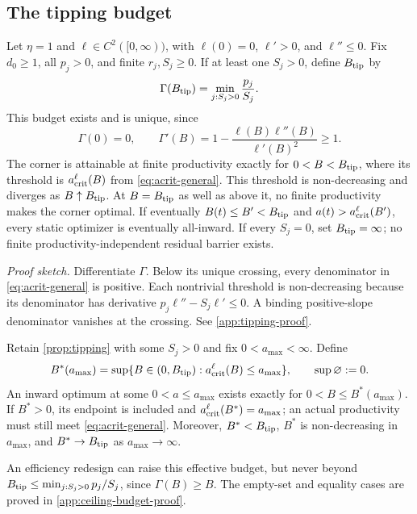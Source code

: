 \subsection{The tipping budget}

\begin{proposition}
\label{prop:tipping}
Let $\eta=1$ and $\ell\in C^2([0,\infty))$, with $\ell(0)=0$,
$\ell'>0$, and $\ell''\leq0$. Fix $d_0\geq1$, all $p_j>0$, and finite
$r_j,S_j\geq0$. If at least one $S_j>0$, define $B_{\rm tip}$ by
\begin{equation}
 \Gamma(B_{\rm tip})=\min_{j:S_j>0}\frac{p_j}{S_j}.
 \label{eq:tipping-budget}
\end{equation}
This budget exists and is unique, since
\begin{equation}
 \Gamma(0)=0,\qquad
 \Gamma'(B)=1-\frac{\ell(B)\ell''(B)}{\ell'(B)^2}\geq1.
 \label{eq:gamma-monotone}
\end{equation}
The corner is attainable at finite productivity exactly for
$0<B<B_{\rm tip}$, where its threshold is
$a_{\rm crit}^{\ell}(B)$ from \cref{eq:acrit-general}.
This threshold is non-decreasing and diverges as
$B\uparrow B_{\rm tip}$. At $B=B_{\rm tip}$ as well as above it,
no finite productivity makes the corner optimal.
If eventually $B(t)\leq B'<B_{\rm tip}$ and
$a(t)>a_{\rm crit}^{\ell}(B')$, every static optimizer is eventually
all-inward. If every $S_j=0$, set
$B_{\rm tip}=\infty$; no finite productivity-independent residual
barrier exists.
\end{proposition}
\noindent\emph{Proof sketch.}
Differentiate $\Gamma$. Below its unique crossing, every denominator
in \cref{eq:acrit-general} is positive. Each nontrivial threshold is
non-decreasing because its denominator has derivative
$p_j\ell''-S_j\ell'\leq0$. A binding positive-slope denominator
vanishes at the crossing. See \cref{app:tipping-proof}.

\begin{corollary}
\label{cor:ceiling-budget}
Retain \cref{prop:tipping} with some $S_j>0$ and fix
$0<a_{\max}<\infty$. Define
\begin{equation}
 B^*(a_{\max})=\sup\{B\in(0,B_{\rm tip}):
                     a_{\rm crit}^{\ell}(B)\leq a_{\max}\},
 \qquad \sup\varnothing:=0.
 \label{eq:ceiling-budget}
\end{equation}
An inward optimum at some $0<a\leq a_{\max}$ exists exactly for
$0<B\leq B^*(a_{\max})$. If $B^*>0$, its endpoint is included and
$a_{\rm crit}^{\ell}(B^*)=a_{\max}$; an actual productivity must still
meet \cref{eq:acrit-general}. Moreover, $B^*<B_{\rm tip}$,
$B^*$ is non-decreasing in $a_{\max}$, and $B^*\to B_{\rm tip}$ as
$a_{\max}\to\infty$.
\end{corollary}
An efficiency redesign can raise this effective budget, but never beyond
$B_{\rm tip}\leq\min_{j:S_j>0}p_j/S_j$, since $\Gamma(B)\geq B$.
The empty-set and equality cases are proved in \cref{app:ceiling-budget-proof}.


